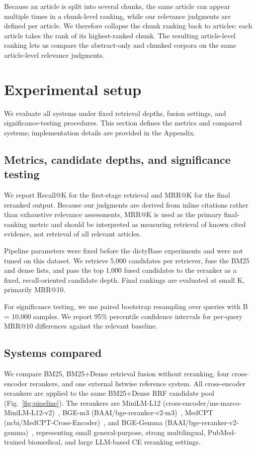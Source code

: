 \documentclass[runningheads]{llncs}
\begin{document}
Because an article is split into several chunks, the same article can appear multiple times in a chunk-level ranking, while our relevance judgments are defined per article. We therefore collapse the chunk ranking back to articles: each article takes the rank of its highest-ranked chunk. The resulting article-level ranking lets us compare the abstract-only and chunked corpora on the same article-level relevance judgments.

\FloatBarrier
\section{Experimental setup}
\label{sec:experimental_setup}

We evaluate all systems under fixed retrieval depths, fusion settings, and significance-testing procedures. This section defines the metrics and compared systems; implementation details are provided in the Appendix.

\subsection{Metrics, candidate depths, and significance testing}
\label{sec:metrics_significance}
We report Recall@K for the first-stage retrieval and MRR@K for the final reranked output. Because our judgments are derived from inline citations rather than exhaustive relevance assessments, MRR@K is used as the primary final-ranking metric and should be interpreted as measuring retrieval of known cited evidence, not retrieval of all relevant articles.

Pipeline parameters were fixed before the dictyBase experiments and were not tuned on this dataset. We retrieve 5,000 candidates per retriever, fuse the BM25 and dense lists, and pass the top 1,000 fused candidates to the reranker as a fixed, recall-oriented candidate depth. Final rankings are evaluated at small K, primarily MRR@10.

For significance testing, we use paired bootstrap resampling over queries with B = 10,000 samples. We report 95\% percentile confidence intervals for per-query MRR@10 differences against the relevant baseline.

\subsection{Systems compared}
\label{sec:systems_compared}
We compare BM25, BM25+Dense retrieval fusion without reranking, four cross-encoder rerankers, and one external listwise reference system. All cross-encoder rerankers are applied to the same BM25+Dense RRF candidate pool (Fig.~\ref{fig:pipeline}). The rerankers are MiniLM-L12 (cross-encoder/ms-marco-MiniLM-L12-v2)~\cite{wang_minilm_2020,noauthor_cross-encoder-ms-marco-minilm-l12-v2_2026}, BGE-m3 (BAAI/bge-reranker-v2-m3)~\cite{chen_m3-embedding_2024,noauthor_baaibge-reranker-v2-m3_2026}, MedCPT (ncbi/MedCPT-Cross-Encoder)~\cite{noauthor_ncbimedcpt-cross-encoder_2026}, and BGE-Gemma (BAAI/bge-reranker-v2-gemma)~\cite{noauthor_baaibge-reranker-v2-gemma_2026}, representing small general-purpose, strong multilingual, PubMed-trained biomedical, and large LLM-based CE reranking settings.
\end{document}
